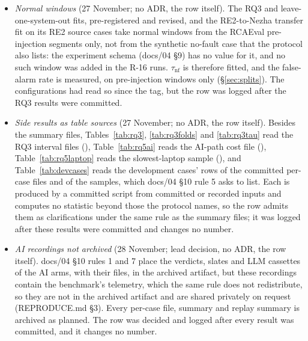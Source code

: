 \begin{itemize}
\item \emph{Normal windows} (27 November; no ADR, the row itself). The RQ3 and leave-one-system-out fits, pre-registered and revised, and the RE2-to-Nezha transfer fit on its RE2 source cases take normal windows from the RCAEval pre-injection segments only, not from the synthetic no-fault case that the protocol also lists: the experiment schema (docs/04 §9) has no  value for it, and no such window was added in the R-16 runs. $\tau_\text{nf}$ is therefore fitted, and the false-alarm rate is measured, on pre-injection windows only (\S\ref{sec:splits}). The configurations had read so since the tag, but the row was logged after the RQ3 results were committed.
\item \emph{Side results as table sources} (27 November; no ADR, the row itself). Besides the summary files, Tables~\ref{tab:rq3}, \ref{tab:rq3folds} and \ref{tab:rq3tau} read the RQ3 interval files (), Table~\ref{tab:rq5ai} reads the AI-path cost file (), Table~\ref{tab:rq5laptop} reads the slowest-laptop sample (), and Table~\ref{tab:devcases} reads the development cases' rows of the committed per-case files and of the  samples, which docs/04 §10 rule 5 asks to list. Each is produced by a committed script from committed or recorded inputs and computes no statistic beyond those the protocol names, so the row admits them as clarifications under the same rule as the summary files; it was logged after these results were committed and changes no number.
\item \emph{AI recordings not archived} (28 November; lead decision, no ADR, the row itself). docs/04 §10 rules 1 and 7 place the verdicts, slates and LLM cassettes of the AI arms, with their  files, in the archived artifact, but these recordings contain the benchmark's telemetry, which the same rule does not redistribute, so they are not in the archived artifact and are shared privately on request (REPRODUCE.md §3). Every per-case file, summary and replay summary is archived as planned. The row was decided and logged after every result was committed, and it changes no number.
\end{itemize}

